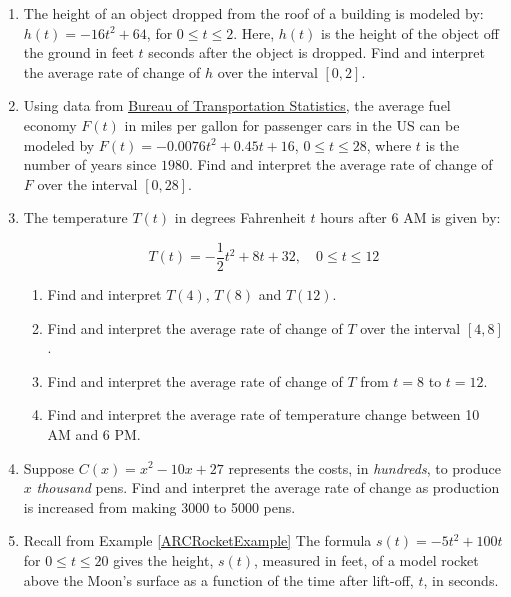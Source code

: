 \begin{enumerate}
\setcounter{enumi}{\value{HW}}

\item  The height of an object dropped from the roof of a building is modeled by:  $h(t) = -16t^2 + 64$, for $0 \leq t \leq 2$. Here,  $h(t)$ is the height of the object off the ground in feet $t$ seconds after the object is dropped.  Find and interpret the average rate of change of $h$ over the interval $[0,2]$.

\item Using data from \href{http://www.bts.gov/publications/national_transportation_statistics/html/table_04_23.html}{\underline{Bureau of Transportation Statistics}}, the average fuel economy $F(t)$ in miles per gallon for passenger cars in the US can be modeled by  $F(t) = -0.0076t^2+0.45t + 16$, $0 \leq t \leq 28$, where $t$ is the number of years since $1980$. Find and interpret the average rate of change of $F$ over the interval $[0,28]$.



\item  The temperature $T(t)$ in degrees Fahrenheit $t$ hours after 6 AM is given by:

\[ T(t) = -\frac{1}{2} t^2 + 8t+32, \quad 0 \leq t \leq 12\]

\begin{enumerate}

\item  Find and interpret $T(4)$, $T(8)$ and $T(12)$.

\item  Find and interpret the average rate of change of $T$ over the interval $[4,8]$.

\item  Find and interpret the average rate of change of $T$ from $t=8$ to $t=12$.

\item  Find and interpret the average rate of temperature change between 10 AM and 6 PM.

\end{enumerate}

\item  Suppose $C(x) = x^2-10x+27$ represents the costs, in \textit{hundreds}, to produce $x$ \textit{thousand} pens.  Find and interpret the average rate of change as production is increased from making 3000 to 5000 pens.


\item Recall from Example \ref{ARCRocketExample} The formula $s(t) = -5t^2+100t$ for $0 \leq t \leq 20$ gives the height, $s(t)$, measured in feet, of a model rocket above the Moon's surface as a function of the time after lift-off, $t$, in seconds.


\end{enumerate}
